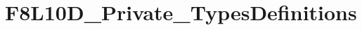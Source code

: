 \hypertarget{group___f8_l10_d___private___types_definitions}{}\section{F8\+L10\+D\+\_\+\+Private\+\_\+\+Types\+Definitions}
\label{group___f8_l10_d___private___types_definitions}
